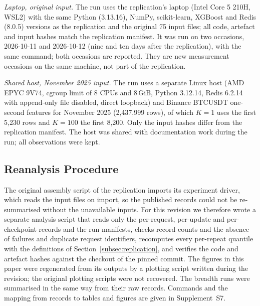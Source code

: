 \documentclass[a4paper,fleqn]{cas-dc}
\begin{document}
\emph{Laptop, original input.} The run uses the replication's laptop (Intel Core 5 210H, WSL2) with the same Python (3.13.16), NumPy, scikit-learn, XGBoost and Redis (8.0.5) versions as the replication and the original 75 input files; all code, artefact and input hashes match the replication manifest. It was run on two occasions, 2026-10-11 and 2026-10-12 (nine and ten days after the replication), with the same command; both occasions are reported. They are new measurement occasions on the same machine, not part of the replication.

\emph{Shared host, November 2025 input.} The run uses a separate Linux host (AMD EPYC 9V74, cgroup limit of 8 CPUs and 8\,GiB, Python 3.12.14, Redis 6.2.14 with append-only file disabled, direct loopback) and Binance BTCUSDT one-second features for November 2025 (2,437,999 rows), of which $K=1$ uses the first 5,230 rows and $K=100$ the first 8,200. Only the input hashes differ from the replication manifest. The host was shared with documentation work during the run; all observations were kept.

\subsection{Reanalysis Procedure}
\label{subsec:reanalysis}
The original assembly script of the replication imports its experiment driver, which reads the input files on import, so the published records could not be re-summarised without the unavailable inputs. For this revision we therefore wrote a separate analysis script that reads only the per-request, per-update and per-checkpoint records and the run manifests, checks record counts and the absence of failures and duplicate request identifiers, recomputes every per-repeat quantile with the definitions of Section~\ref{subsec:replication}, and verifies the code and artefact hashes against the checkout of the pinned commit. The figures in this paper were regenerated from its outputs by a plotting script written during the revision; the original plotting scripts were not recovered. The breadth runs were summarised in the same way from their raw records. Commands and the mapping from records to tables and figures are given in Supplement~S7.
\end{document}
